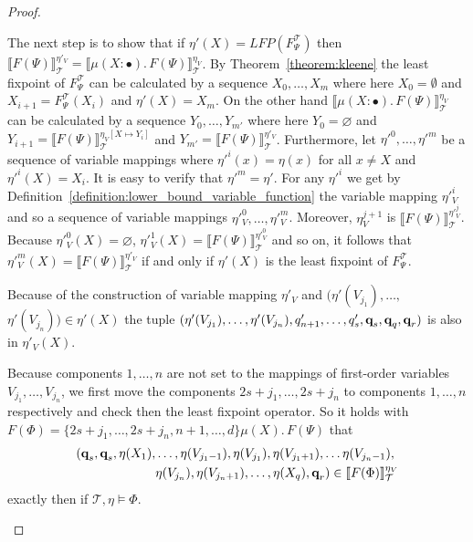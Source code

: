 \begin{proof}
\begin{compactitem}
        The next step is to show that if $\eta'(X) = LFP(F^\mathcal{T}_\Psi)$ then $\llbracket F(\Psi) \rrbracket^{\eta'_V}_\mathcal{T} = \llbracket \mu (X \colon \bullet).\,F(\Psi)\rrbracket_\mathcal{T}^{\eta_V}$. 
        By Theorem~\ref{theorem:kleene} the least fixpoint of $F^\mathcal{T}_\Psi$ can be calculated by a sequence $X_0, \dots, X_m$ where here $X_0 = \emptyset$ and $X_{i+1} 
        = F_\Psi^\mathcal{T}(X_i)$ and $\eta'(X) = X_m$. On the other hand $\llbracket \mu (X \colon \bullet).\,F(\Psi)\rrbracket_\mathcal{T}^{\eta_V}$ can be calculated by a sequence 
         $Y_0, \dots, Y_{m'}$ where here $Y_0 = \varnothing$ and $Y_{i+1} = \llbracket F(\Psi)\rrbracket_\mathcal{T}^{\eta_V[X \mapsto Y_i]}$ and $Y_{m'} = \llbracket F(\Psi)\rrbracket_\mathcal{T}^{\eta'_V}$. Furthermore, let $\eta'^0, \dots, \eta'^m$ be a sequence of variable mappings where $\eta'^i(x) = \eta(x)$ for all $x \neq X$ and $\eta'^i(X) = X_i$. It is easy to verify that $\eta'^m = \eta'$. For any $\eta'^i$ we get by Definition~\ref{definition:lower_bound_variable_function} the variable mapping $\eta'^i_V$ and so a sequence of variable mappings $\eta'^0_V, \dots, \eta'^m_V$. Moreover, $\eta^{j+1}_V$ is $\llbracket F(\Psi)\rrbracket_\mathcal{T}^{\eta'^j_V}$. Because $\eta'^0_V(X) = \varnothing$, $\eta'^1_V(X) =\llbracket F(\Psi)\rrbracket_\mathcal{T}^{\eta'^0_V}$ and so on, it follows that $\eta'^m_V(X) = \llbracket F(\Psi) \rrbracket^{\eta'_V}_\mathcal{T}$ if and only if $\eta'(X)$ is the least fixpoint of $F^\mathcal{T}_\Psi$.
         
Because of the construction of variable mapping $\eta'_V$ and $(\eta'(V_{j_1}), \dots, 
        $ $\eta'(V_{j_n})) \in \eta'(X)$ the
        tuple $(\eta'(V_{j_1}), \dots, \eta'(V_{j_n}), q_{n+1}', \dots, q_s', \emph{q}_s, \emph{q}_q, \emph{q}_r)$ is also in $\eta'_V(X)$.         
        
       Because components $1, \dots, n$ are not set to the mappings of first-order variables 
       $V_{j_1}, \dots, V_{j_n}$, we first move the components $2s+j_1, \dots, 2s+j_n$ to components $1, \dots, n$ respectively and check then the least fixpoint operator.
        So it holds with $F(\Phi) = \{2s+j_1, \dots, 2s+j_n, n+1, \dots, d\} \mu (X).\, F(\Psi)$ that
        \begin{align*}
            (\emph{q}_s, \emph{q}_s, \eta(X_1),& \dots, \eta(V_{j_1-1}), \eta(V_{j_1}), \eta(V_{j_1+1}), \dots \eta(V_{j_n-1}), \\&
             \eta(V_{j_n}), \eta(V_{j_n+1}), \dots, \eta
            (X_q), \emph{q}_r) \in \llbracket  F(\Phi) \rrbracket^{\eta_V
            }_\mathcal{T}
        \end{align*}
        exactly then if $\mathcal{T}, \eta \models \Phi$.


\end{compactitem}
\end{proof}
